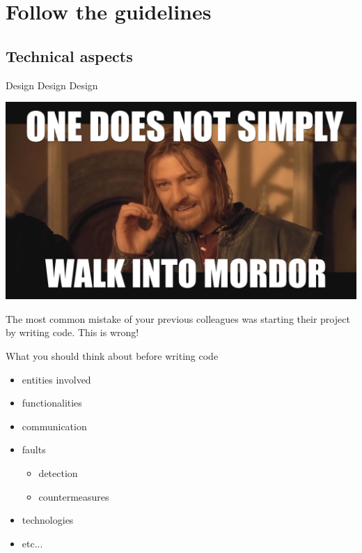 \documentclass[presentation]{beamer}\mode<presentation>{\usetheme{AMSBolognaFC}}
\begin{document}
\section{Follow the guidelines}
\subsection{Technical aspects}

\begin{frame}[c,allowframebreaks]{Design Design Design}
    
    {\centering
    \includegraphics[width=\textwidth]{figures/boromir}}
    
    \framebreak

    The most common mistake of your previous colleagues was starting their project by writing code.
    \alert{This is wrong!}
   
     \begin{block}{What you should think about before writing code}
        \begin{itemize}
            \item entities involved
            \item functionalities
            \item communication
            \item \alert{faults}
            \begin{itemize}
                \item detection
                \item countermeasures
            \end{itemize}
            \item technologies
            \item etc...
        \end{itemize}
    \end{block}
    

\end{frame}
\end{document}
